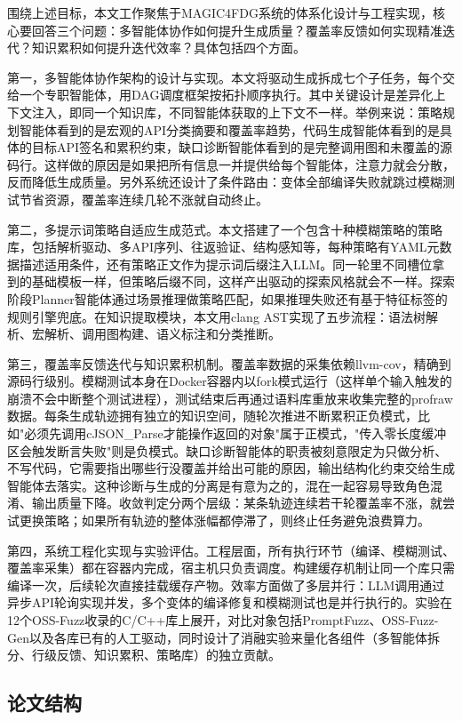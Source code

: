 围绕上述目标，本文工作聚焦于MAGIC4FDG系统的体系化设计与工程实现，核心要回答三个问题：多智能体协作如何提升生成质量？覆盖率反馈如何实现精准迭代？知识累积如何提升迭代效率？具体包括四个方面。

第一，多智能体协作架构的设计与实现。本文将驱动生成拆成七个子任务，每个交给一个专职智能体，用DAG调度框架按拓扑顺序执行。其中关键设计是差异化上下文注入，即同一个知识库，不同智能体获取的上下文不一样。举例来说：策略规划智能体看到的是宏观的API分类摘要和覆盖率趋势，代码生成智能体看到的是具体的目标API签名和累积约束，缺口诊断智能体看到的是完整调用图和未覆盖的源码行。这样做的原因是如果把所有信息一并提供给每个智能体，注意力就会分散，反而降低生成质量。另外系统还设计了条件路由：变体全部编译失败就跳过模糊测试节省资源，覆盖率连续几轮不涨就自动终止。

第二，多提示词策略自适应生成范式。本文搭建了一个包含十种模糊策略的策略库，包括解析驱动、多API序列、往返验证、结构感知等，每种策略有YAML元数据描述适用条件，还有策略正文作为提示词后缀注入LLM。同一轮里不同槽位拿到的基础模板一样，但策略后缀不同，这样产出驱动的探索风格就会不一样。探索阶段Planner智能体通过场景推理做策略匹配，如果推理失败还有基于特征标签的规则引擎兜底。在知识提取模块，本文用clang AST实现了五步流程：语法树解析、宏解析、调用图构建、语义标注和分类推断。

第三，覆盖率反馈迭代与知识累积机制。覆盖率数据的采集依赖llvm-cov，精确到源码行级别。模糊测试本身在Docker容器内以fork模式运行（这样单个输入触发的崩溃不会中断整个测试进程），测试结束后再通过语料库重放来收集完整的profraw数据。每条生成轨迹拥有独立的知识空间，随轮次推进不断累积正负模式，比如"必须先调用cJSON\_Parse才能操作返回的对象"属于正模式，"传入零长度缓冲区会触发断言失败"则是负模式。缺口诊断智能体的职责被刻意限定为只做分析、不写代码，它需要指出哪些行没覆盖并给出可能的原因，输出结构化约束交给生成智能体去落实。这种诊断与生成的分离是有意为之的，混在一起容易导致角色混淆、输出质量下降。收敛判定分两个层级：某条轨迹连续若干轮覆盖率不涨，就尝试更换策略；如果所有轨迹的整体涨幅都停滞了，则终止任务避免浪费算力。

第四，系统工程化实现与实验评估。工程层面，所有执行环节（编译、模糊测试、覆盖率采集）都在容器内完成，宿主机只负责调度。构建缓存机制让同一个库只需编译一次，后续轮次直接挂载缓存产物。效率方面做了多层并行：LLM调用通过异步API轮询实现并发，多个变体的编译修复和模糊测试也是并行执行的。实验在12个OSS-Fuzz收录的C/C++库上展开，对比对象包括PromptFuzz、OSS-Fuzz-Gen以及各库已有的人工驱动，同时设计了消融实验来量化各组件（多智能体拆分、行级反馈、知识累积、策略库）的独立贡献。

\subsection{论文结构}

